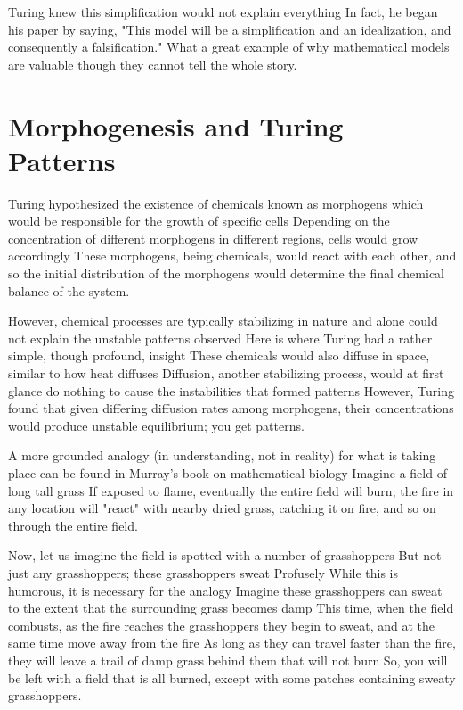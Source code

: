 \documentclass[12pt,a4paper]{amsart}
\numberwithin{equation}{section}
\theoremstyle{plain}
\theoremstyle{definition}
\begin{document}
  Turing knew this simplification would not explain everything
  In fact, he began his paper by saying, "This model will be a simplification and an idealization, and consequently a falsification."
  \cite{turing} What a great example of why mathematical models are valuable though they cannot tell the whole story.

\section{Morphogenesis and Turing Patterns}

  Turing hypothesized the existence of chemicals known as morphogens which would be responsible for the growth of specific cells
  Depending on the concentration of different morphogens in different regions, cells would grow accordingly
  These morphogens, being chemicals, would react with each other, and so the initial distribution of the morphogens would determine the final chemical balance of the system.

  However, chemical processes are typically stabilizing in nature and alone could not explain the unstable patterns observed
  Here is where Turing had a rather simple, though profound, insight
  These chemicals would also diffuse in space, similar to how heat diffuses
  Diffusion, another stabilizing process, would at first glance do nothing to cause the instabilities that formed patterns
  However, Turing found that given differing diffusion rates among morphogens, their concentrations would produce unstable equilibrium; you get patterns.

  A more grounded analogy (in understanding, not in reality) for what is taking place can be found in Murray's book on mathematical biology \cite{murray}
  Imagine a field of long tall grass
  If exposed to flame, eventually the entire field will burn; the fire in any location will "react" with nearby dried grass, catching it on fire, and so on through the entire field.

  Now, let us imagine the field is spotted with a number of grasshoppers
  But not just any grasshoppers; these grasshoppers sweat
  Profusely
  While this is humorous, it is necessary for the analogy
  Imagine these grasshoppers can sweat to the extent that the surrounding grass becomes damp
  This time, when the field combusts, as the fire reaches the grasshoppers they begin to sweat, and at the same time move away from the fire
  As long as they can travel faster than the fire, they will leave a trail of damp grass behind them that will not burn
  So, you will be left with a field that is all burned, except with some patches containing sweaty grasshoppers.
\end{document}
